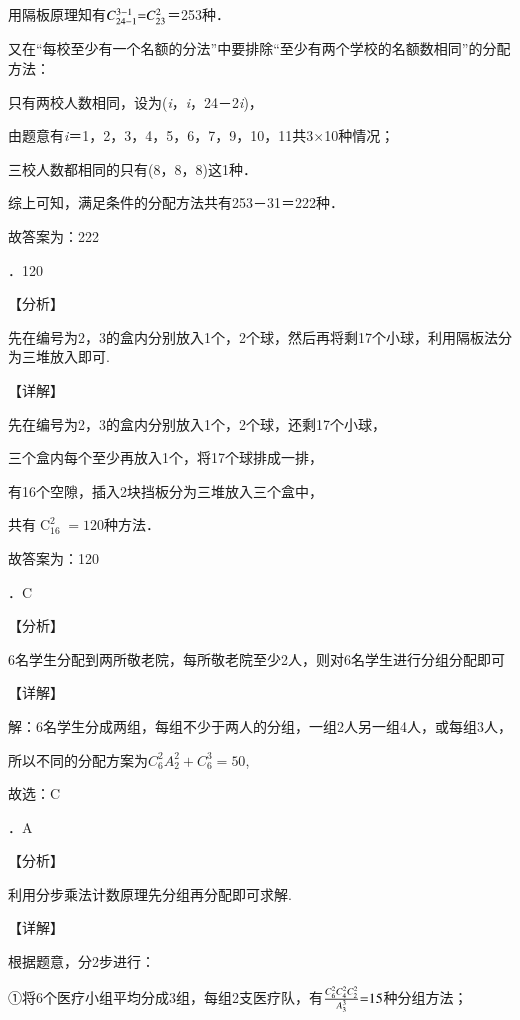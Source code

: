 \documentclass[a4paper,11pt,UTF8,twoside]{ctexart} %
\begin{document}
\noindent 用隔板原理知有$C_{24-1}^{3{\rm -}1} {\rm =}C_{23}^{2} $＝253种．

\noindent 又在``每校至少有一个名额的分法''中要排除``至少有两个学校的名额数相同''的分配方法：

\noindent 只有两校人数相同，设为(\textit{i}，\textit{i}，24－2\textit{i})，

\noindent 由题意有\textit{i}＝1，2，3，4，5，6，7，9，10，11共3$\mathrm{\times}$10种情况；

\noindent 三校人数都相同的只有(8，8，8)这1种．

\noindent 综上可知，满足条件的分配方法共有253－31＝222种．

\noindent 故答案为：222

．120

\noindent 【分析】

\noindent 先在编号为2，3的盒内分别放入1个，2个球，然后再将剩17个小球，利用隔板法分为三堆放入即可.

\noindent 【详解】

\noindent 先在编号为2，3的盒内分别放入1个，2个球，还剩17个小球，

\noindent 三个盒内每个至少再放入1个，将17个球排成一排，

\noindent 有16个空隙，插入2块挡板分为三堆放入三个盒中，

\noindent 共有$\mathop{C}\nolimits_{16}^{2} =120$种方法．

\noindent 故答案为：120

．C

\noindent 【分析】

\noindent 6名学生分配到两所敬老院，每所敬老院至少2人，则对6名学生进行分组分配即可

\noindent 【详解】

\noindent 解：6名学生分成两组，每组不少于两人的分组，一组2人另一组4人，或每组3人，

\noindent 所以不同的分配方案为$C_{6}^{2} A_{2}^{2} +C_{6}^{3} =50$,

\noindent 故选：C

．A

\noindent 【分析】

\noindent 利用分步乘法计数原理先分组再分配即可求解.

\noindent 【详解】

\noindent 根据题意，分2步进行：

\noindent ①将6个医疗小组平均分成3组，每组2支医疗队，有$\frac{C_{6}^{2} C_{4}^{2} C_{2}^{2} }{A_{3}^{3} } {\rm =}15$种分组方法；
\end{document}

